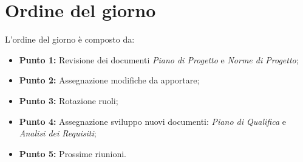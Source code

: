 \section{Ordine del giorno}
L'ordine del giorno è composto da: 
\begin{itemize}
	\item \textbf{Punto 1:} Revisione dei documenti \textit{Piano di Progetto} e \textit{Norme di Progetto}; 
	\item \textbf{Punto 2:} Assegnazione modifiche da apportare; 
	\item \textbf{Punto 3:} Rotazione ruoli;
	\item \textbf{Punto 4:} Assegnazione sviluppo nuovi documenti: \textit{Piano di Qualifica} e \textit{Analisi dei Requisiti};
	\item \textbf{Punto 5:} Prossime riunioni.
\end{itemize}
